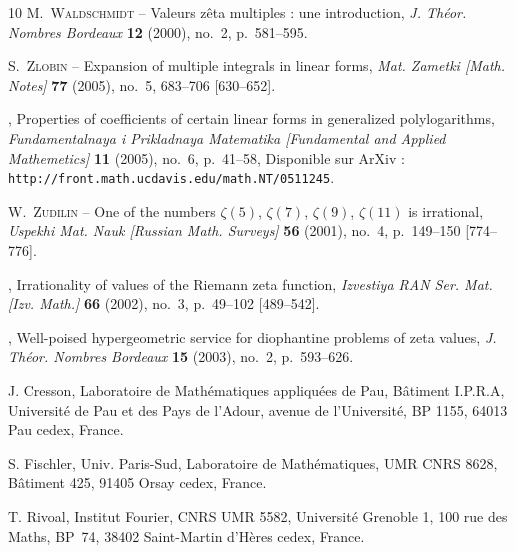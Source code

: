 \documentclass[12pt,francais, reqno]{smfart}
\numberwithin{equation}{section}
\begin{document}
\begin{thebibliography}{10}
{\scshape M.~Waldschmidt} -- {\og Valeurs z\^eta multiples : une
  introduction\fg}, \emph{J. Th{\'e}or. Nombres Bordeaux} \textbf{12} (2000),
  no.~2, p.~581--595.

{\scshape S.~Zlobin} -- {\og Expansion of multiple integrals in linear forms\fg}, \emph{Mat. Zametki [Math. Notes]} \textbf{77} (2005), no.~5, 683--706 [630--652].

\bysame , {\og Properties of coefficients of certain linear forms
  in generalized polylogarithms\fg}, \emph{Fundamentalnaya i Prikladnaya
  Matematika [Fundamental and Applied Mathemetics]} \textbf{11} (2005), no.~6,
  p.~41--58, Disponible sur ArXiv :
  {\tt{http\!\!://front.math.ucdavis.edu/math.NT/0511245}}.

{\scshape W.~Zudilin} -- {\og One of the numbers $\zeta(5)$, $\zeta(7)$,
  $\zeta(9)$, $\zeta(11)$ is irrational\fg}, \emph{Uspekhi Mat. Nauk [Russian
  Math. Surveys]} \textbf{56} (2001), no.~4, p.~149--150 [774--776].

\bysame , {\og Irrationality of values of the {R}iemann zeta function\fg},
  \emph{Izvestiya RAN Ser. Mat. [Izv. Math.]} \textbf{66} (2002), no.~3,
  p.~49--102 [489--542].

\bysame , {\og Well-poised hypergeometric service for diophantine problems of
  zeta values\fg}, \emph{J. Th{\'e}or. Nombres Bordeaux} \textbf{15} (2003),
  no.~2, p.~593--626.

\end{thebibliography}

\bigskip 

J. Cresson, 
Laboratoire de Math\'ematiques appliqu\'ees de Pau,
B\^atiment I.P.R.A, Univer\-si\-t\'e de Pau et des Pays de l'Adour,
avenue de l'Universit\'e, BP 1155, 64013 Pau cedex, France.

\medskip

S. Fischler,
Univ. Paris-Sud, Laboratoire de  Math\'ematiques,  UMR CNRS 8628, 
B\^atiment 425,
91405 Orsay cedex, France.

\medskip

T. Rivoal,
Institut Fourier,
CNRS UMR 5582, Universit{\'e} Grenoble 1,
100 rue des Maths, BP~74,
38402 Saint-Martin d'H{\`e}res cedex,
France.
\end{document}
